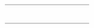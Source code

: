 \documentclass[11pt]{article}
\begin{document}
\begin{center}
\begin{tabularx}{\textwidth}{|C{0.5in}||C{0.5in}|C{0.5in}|C{0.5in}||C{0.5in}|C{0.5in}|C{0.5in}|C{0.5in}||X|}
    & & & & & & & & \\
    \hline

    & & & & & & & & \\
    \hline

    & & & & & & & & \\
    \hline

    & & & & & & & & \\
    \hline

    & & & & & & & & \\
    \hline

    
    & & & & & & & & \\
    \hline
     
    
  \end{tabularx}
\end{center}
\end{document}
